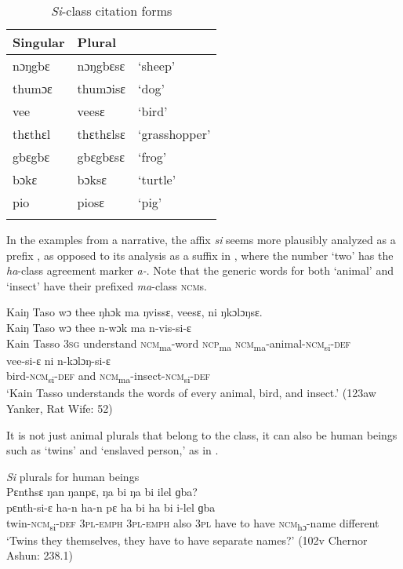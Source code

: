 \begin{table}
\caption{\label{tab:nounclass:37}\textit{Si}{}-class citation forms}

\begin{tabular}{lll}
\lsptoprule
Singular & Plural & \\
\midrule
nɔŋgbɛ & nɔŋgbɛsɛ & ‘sheep'\\
thumɔɛ & thumɔisɛ & ‘dog'\\
vee & veesɛ & ‘bird'\\
thɛthɛl & thɛthɛlsɛ & ‘grasshopper'\\
gbɛgbɛ & gbɛgbɛsɛ & ‘frog'\\
bɔkɛ & bɔksɛ & ‘turtle'\\
pio & piosɛ & ‘pig'\\
\lspbottomrule
\end{tabular}
\end{table}

In the examples from a narrative, the affix \textit{si} seems more plausibly analyzed as a prefix , as opposed to its analysis as a suffix in , where the number ‘two' has the \textit{ha}{}-class agreement marker \textit{a-}. Note that the generic words for both ‘animal' and ‘insect' have their prefixed \textit{ma}\nobreakdash-class \textsc{ncm}s.

\newpage
\ea%
    \label{ex:145}
    Kaiŋ Taso wɔ thee ŋhɔk ma ŋvissɛ, veesɛ, ni ŋkɔlɔŋsɛ.\\
    \gll Kaiŋ  Taso    wɔ    thee      n-wɔk      ma    n-vis-si-ɛ\\
    Kain  Tasso    \textsc{3sg}  understand  \textsc{ncm}\textsubscript{ma}{}-word  \textsc{ncp}\textsubscript{ma}    \textsc{ncm}\textsubscript{ma}{}-animal-\textsc{ncm}\textsubscript{si}{}-\textsc{def}\\
    \gll vee-si-ɛ        ni    n-kɔlɔŋ-si-ɛ\\
    bird-\textsc{ncm}\textsubscript{si}{}-\textsc{def}  and  \textsc{ncm}\textsubscript{ma}{}-insect-\textsc{ncm}\textsubscript{si}{}-\textsc{def}\\
    \glt ‘Kain Tasso understands the words of every animal, bird, and insect.' (123aw Yanker, Rat Wife: 52)
\z

It is not just animal plurals that belong to the class, it can also be human beings such as ‘twins' and ‘enslaved person,' as in .

\ea%
    \label{ex:146}
    \textit{Si} plurals for human beings\\
    \ea Pɛnthsɛ ŋan ŋanpɛ, ŋa bi ŋa bi ilel ɡba?\\
    \gll pɛnth-si-ɛ      ha-n      ha-n      pɛ    ha    bi    ha  bi    i-lel        ɡba\\
    twin-\textsc{ncm}\textsubscript{si}{}-\textsc{def}  \textsc{3pl}{}-\textsc{emph}  \textsc{3pl}{}-\textsc{emph}  also  \textsc{3pl}  have  to  have  \textsc{ncm}\textsubscript{hɔ}{}-name   different\\
    \glt ‘Twins they themselves, they have to have separate names?' (102v Chernor Ashun: 238.1)


